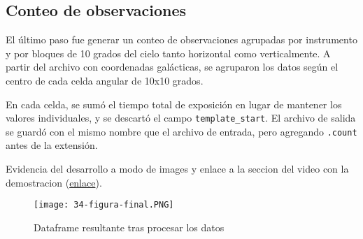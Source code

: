 \documentclass[12pt,letterpaper,twoside]{article}
\begin{document}
\begin{code}[H]
    
\end{code}

\subsection{Conteo de observaciones}

El último paso fue generar un conteo de observaciones agrupadas por instrumento y por bloques de 10 grados del cielo tanto horizontal como verticalmente. A partir del archivo con coordenadas galácticas, se agruparon los datos según el centro de cada celda angular de 10x10 grados.

En cada celda, se sumó el tiempo total de exposición en lugar de mantener los valores individuales, y se descartó el campo \texttt{template\_start}. El archivo de salida se guardó con el mismo nombre que el archivo de entrada, pero agregando \texttt{.count} antes de la extensión.

Evidencia del desarrollo a modo de images y enlace a la seccion del video con la demostracion ({\color{blue}\href{https://youtu.be/GdrpnyFULTI?si=if9d7dEC7Wyjnwij&t=1303}{enlace}}).

\begin{figure}[H]
    \centering
    \texttt{[image: 34-figura-final.PNG]}
    \caption{Dataframe resultante tras procesar los datos}
\end{figure}

\newpage

\begin{code}[H]
    
\end{code}
\newpage
\end{document}

